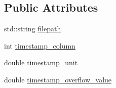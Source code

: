 \subsection*{Public Attributes}
\begin{DoxyCompactItemize}
\item 
std\-::string \hyperlink{classsvl_filter_source_text_file_types_1_1_file_info_abc8384306829626692324b74274d1a46}{filepath}
\item 
int \hyperlink{classsvl_filter_source_text_file_types_1_1_file_info_a5d3a2e6aff4aa81a4d2d193986b81c47}{timestamp\-\_\-column}
\item 
double \hyperlink{classsvl_filter_source_text_file_types_1_1_file_info_aa6d0b04ba4092e788a532c3d88a0420e}{timestamp\-\_\-unit}
\item 
double \hyperlink{classsvl_filter_source_text_file_types_1_1_file_info_a55999a312d5bc7effb3d0541c4f7a833}{timestamp\-\_\-overflow\-\_\-value}
\end{DoxyCompactItemize}


